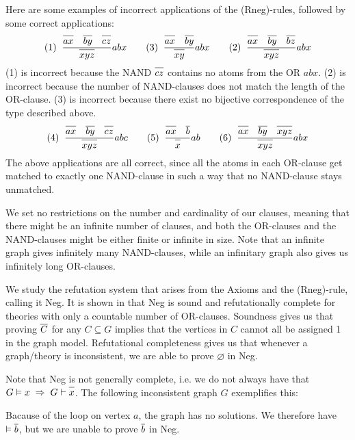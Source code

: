 Here are some examples of incorrect applications of the (Rneg)-rules, followed by some correct applications:
\begin{align}
  (1)\;\;\frac{\ol{ax}\quad\ol{by}\quad\ol{cz}}{\ol{xyz}}abx\quad\quad
  (3)\;\;\frac{\ol{ax}\quad\ol{by}}{\ol{xy}}abx\quad\quad
  (2)\;\;\frac{\ol{ax}\quad\ol{by}\quad\ol{bz}}{\ol{xyz}}abx
\end{align}
(1) is incorrect because the NAND $\ol{cz}$ contains no atoms from the OR $abx$.
(2) is incorrect because the number of NAND-clauses does not match the length of the OR-clause.
(3) is incorrect because there exist no bijective correspondence of the type described above.
\begin{align}
  (4)\;\;\frac{\ol{ax}\quad\ol{by}\quad\ol{cz}}{\ol{xyz}}abc\quad\quad
  (5)\;\;\frac{\ol{ax}\quad\ol{b}}{\ol{x}}ab\quad\quad
  (6)\;\;\frac{\ol{ax}\quad\ol{by}\quad\ol{xyz}}{\ol{xyz}}abx
\end{align}
The above applications are all correct, since all the atoms in each OR-clause get matched to exactly one NAND-clause in such a way that no NAND-clause stays unmatched.

We set no restrictions on the number and cardinality of our clauses, meaning that there might be an infinite number of clauses, and both the OR-clauses and the NAND-clauses might be either finite or infinite in size.
Note that an infinite graph gives infinitely many NAND-clauses, while an infinitary graph also gives us infinitely long OR-clauses.

We study the refutation system that arises from the Axioms and the (Rneg)-rule, calling it Neg.
It is shown in \cite{michal-completeness} that Neg is sound and refutationally complete for theories with only a countable number of OR-clauses.
Soundness gives us that proving $\ol{C}$ for any $C \subseteq G$ implies that the vertices in $C$ cannot all be assigned 1 in the graph model.
Refutational completeness gives us that whenever a graph/theory is inconsistent, we are able to prove $\varnothing$ in Neg.

Note that Neg is not generally complete, i.e. we do not always have that $G\vDash {x} \; \Rightarrow \; G \vdash \ol{x}$.
The following inconsistent graph $G$ exemplifies this:\par
\begin{figure}[!h]
  \centering
  \caption{}
  \label{fig:neg_not_complete}
\end{figure}
Bacause of the loop on vertex $a$, the graph has no solutions.
We therefore have $\vDash \ol{b}$, but we are unable to prove $\ol{b}$ in Neg.
